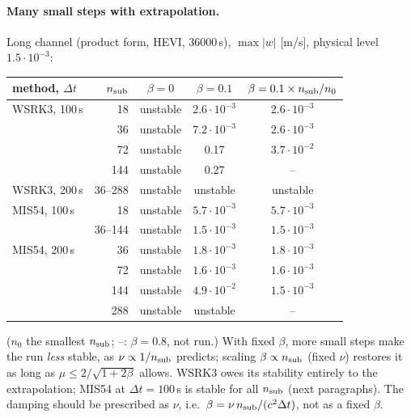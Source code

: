 \documentclass[11pt,a4paper]{article}
\newcommand{\dt}{\Delta t}
\begin{document}
\paragraph{Many small steps with extrapolation.} Long channel (product form, HEVI, 36000\,s), $\max|w|$
[m/s], physical level $1.5\cdot10^{-3}$:
\begin{center}\small\begin{tabular}{lrccc}\toprule
method, $\dt$ & $n_{\rm sub}$ & $\beta=0$ & $\beta=0.1$ & $\beta=0.1\times n_{\rm sub}/n_0$\\\midrule
WSRK3, 100\,s & 18 & unstable & $2.6\cdot10^{-3}$ & $2.6\cdot10^{-3}$\\
 & 36 & unstable & $7.2\cdot10^{-3}$ & $2.6\cdot10^{-3}$\\
 & 72 & unstable & 0.17 & $3.7\cdot10^{-2}$\\
 & 144 & unstable & 0.27 & --\\
WSRK3, 200\,s & 36--288 & unstable & unstable & unstable\\
MIS54, 100\,s & 18 & unstable & $5.7\cdot10^{-3}$ & $5.7\cdot10^{-3}$\\
 & 36--144 & unstable & $1.5\cdot10^{-3}$ & $1.5\cdot10^{-3}$\\
MIS54, 200\,s & 36 & unstable & $1.8\cdot10^{-3}$ & $1.8\cdot10^{-3}$\\
 & 72 & unstable & $1.6\cdot10^{-3}$ & $1.6\cdot10^{-3}$\\
 & 144 & unstable & $4.9\cdot10^{-2}$ & $1.5\cdot10^{-3}$\\
 & 288 & unstable & unstable & --\\\bottomrule
\end{tabular}\end{center}
($n_0$ the smallest $n_{\rm sub}$; --: $\beta=0.8$, not run.) With fixed $\beta$, more small steps make the run
\emph{less} stable, as $\nu\propto1/n_{\rm sub}$ predicts; scaling $\beta\propto n_{\rm sub}$ (fixed $\nu$)
restores it as long as $\mu\le2/\sqrt{1+2\beta}$ allows. WSRK3 owes its stability entirely to the
extrapolation; MIS54 at $\dt=100$\,s is stable for all $n_{\rm sub}$ (next paragraphs). The damping should be
prescribed as $\nu$, i.e.\ $\beta=\nu\,n_{\rm sub}/(c^2\dt)$, not as a fixed $\beta$.
\end{document}

